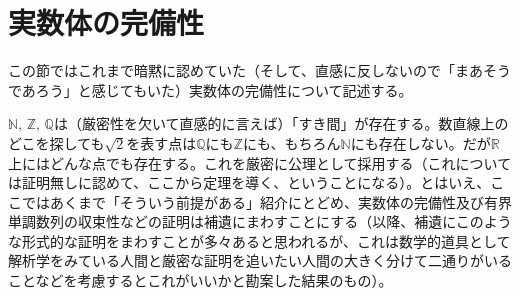 \clearpage
\section{実数体の完備性}
この節ではこれまで暗黙に認めていた（そして、直感に反しないので「まあそうであろう」と感じてもいた）実数体の完備性について記述する。

$\mathbb{N},\,\mathbb{Z},\,\mathbb{Q}$は（厳密性を欠いて直感的に言えば）「すき間」が存在する。数直線上のどこを探しても$\sqrt{2}$を表す点は$\mathbb{Q}$にも$\mathbb{Z}$にも、もちろん$\mathbb{N}$にも存在しない。だが$\mathbb{R}$上にはどんな点でも存在する。これを厳密に公理として採用する（これについては証明無しに認めて、ここから定理を導く、ということになる）。とはいえ、ここではあくまで「そういう前提がある」紹介にとどめ、実数体の完備性及び有界単調数列の収束性などの証明は補遺にまわすことにする（以降、補遺にこのような形式的な証明をまわすことが多々あると思われるが、これは数学的道具として解析学をみている人間と厳密な証明を追いたい人間の大きく分けて二通りがいることなどを考慮するとこれがいいかと勘案した結果のもの）。